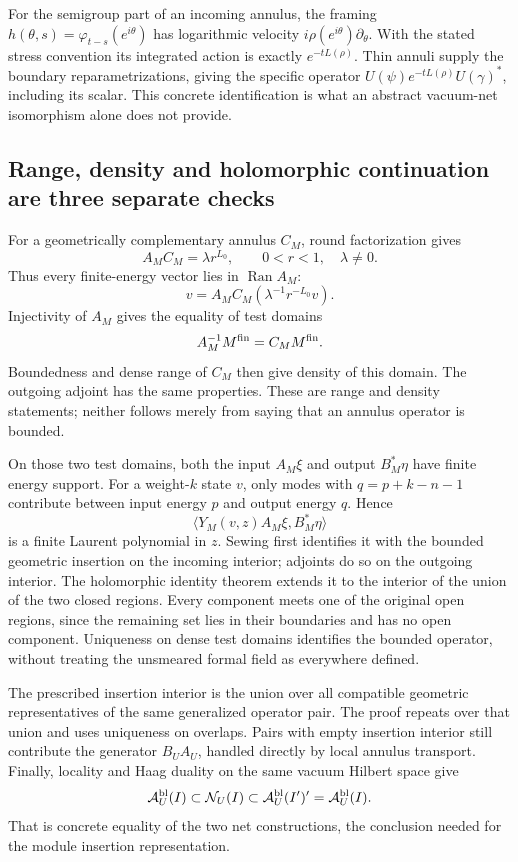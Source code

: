 For the semigroup part of an incoming annulus, the framing
$h(\theta,s)=\varphi_{t-s}(e^{i\theta})$ has logarithmic velocity
$i\rho(e^{i\theta})\partial_\theta$. With the stated stress
convention its integrated action is exactly $e^{-tL(\rho)}$.
Thin annuli supply the boundary reparametrizations, giving the
specific operator
$U(\psi)e^{-tL(\rho)}U(\gamma)^*$, including its scalar.
This concrete identification is what an abstract vacuum-net
isomorphism alone does not provide.

\subsection{Range, density and holomorphic continuation are three separate checks}

For a geometrically complementary annulus $C_M$, round
factorization gives
\[
 A_MC_M=\lambda r^{L_0},\qquad0<r<1,\quad\lambda\ne0.
\]
Thus every finite-energy vector lies in $\operatorname{Ran}A_M$:
\[
 v=A_MC_M(\lambda^{-1}r^{-L_0}v).
\]
Injectivity of $A_M$ gives the equality of test domains
\[
 A_M^{-1}M^{\rm fin}=C_MM^{\rm fin}.
\]
Boundedness and dense range of $C_M$ then give density of this
domain. The outgoing adjoint has the same properties. These are
range and density statements; neither follows merely from saying
that an annulus operator is bounded.

On those two test domains, both the input $A_M\xi$ and output
$B_M^*\eta$ have finite energy support. For a weight-$k$ state
$v$, only modes with $q=p+k-n-1$ contribute between input energy
$p$ and output energy $q$. Hence
\[
 \langle Y_M(v,z)A_M\xi,B_M^*\eta\rangle
\]
is a finite Laurent polynomial in $z$. Sewing first identifies
it with the bounded geometric insertion on the incoming interior;
adjoints do so on the outgoing interior. The holomorphic identity
theorem extends it to the interior of the union of the two closed
regions. Every component meets one of the original open regions,
since the remaining set lies in their boundaries and has no open
component. Uniqueness on dense test domains identifies the bounded
operator, without treating the unsmeared formal field as everywhere
defined.

The prescribed insertion interior is the union over all compatible
geometric representatives of the same generalized operator pair.
The proof repeats over that union and uses uniqueness on overlaps.
Pairs with empty insertion interior still contribute the generator
$B_UA_U$, handled directly by local annulus transport. Finally,
locality and Haag duality on the same vacuum Hilbert space give
\[
 \mathcal A_U^{\rm bl}(I)\subset\mathcal N_U(I)
 \subset\mathcal A_U^{\rm bl}(I')'
 =\mathcal A_U^{\rm bl}(I).
\]
That is concrete equality of the two net constructions, the
conclusion needed for the module insertion representation.

